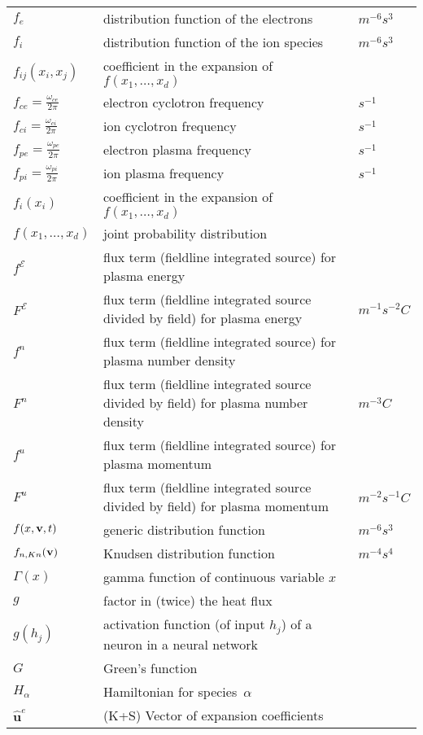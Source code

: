 \begin{longtable}{|p{3.0cm}|p{10.0cm}|p{3.0cm}|}
$f_e$ & distribution function of the electrons & $m^{-6} s^3$ \\
$f_i$ & distribution function of the ion species & $m^{-6} s^3$ \\
$f_{ij}(x_i,x_j)$ & coefficient in the expansion of $f\left(x_1,\ldots,x_d\right)$  & \\
$f_{ce}= \frac{\omega_{ce}}{2\pi}$ & electron cyclotron frequency & $s^{-1}$ \\
$f_{ci}= \frac{\omega_{ci}}{2\pi}$ & ion cyclotron frequency & $s^{-1}$ \\
$f_{pe}= \frac{\omega_{pe}}{2\pi}$ & electron plasma frequency & $s^{-1}$ \\
$f_{pi}= \frac{\omega_{pi}}{2\pi}$ & ion plasma frequency & $s^{-1}$ \\
$f_i(x_i)$ & coefficient in the expansion of $f\left(x_1,\ldots,x_d\right)$  & \\
$f\left(x_1,\ldots,x_d\right)$ & joint probability distribution  & \\
$f^\mathcal{E}$ & flux term (fieldline integrated source) for plasma energy  & \\
$F^\mathcal{E}$ & flux term (fieldline integrated source divided by field) for plasma energy  &  $m^{-1} s^{-2} C$ \\
$f^n$ & flux term (fieldline integrated source) for plasma number density & \\
$F^n$ & flux term (fieldline integrated source divided by field) for plasma number density  &  $m^{-3} C$ \\
$f^u$ & flux term (fieldline integrated source) for plasma momentum  & \\
$F^u$ & flux term (fieldline integrated source divided by field) for plasma momentum  &  $m^{-2} s^{-1} C$ \\
$f(x,{\bf v},t)$ & generic distribution function & $m^{-6} s^3$ \\
$f_{n,Kn}({\bf v})$ & Knudsen distribution function & $m^{-4} s^4$ \\
$\Gamma(x)$ & gamma function of continuous variable $x$  & \\
$g$ & factor in (twice) the heat flux  & \\
$g(h_j)$ & activation function (of input $h_j$) of a neuron in a neural network  & \\
$G$ & Green's function & \\
$H_\alpha$ & Hamiltonian for species~$\alpha$ & \\
$\hat{\boldsymbol{u}}^e$ &  (K+S) Vector of expansion coefficients & \\

\end{longtable}
